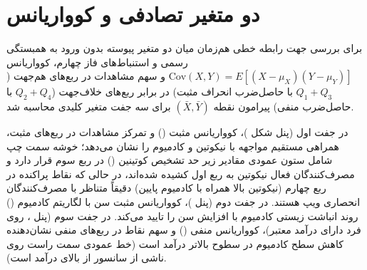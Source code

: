\documentclass[12pt]{exam}
\begin{document}
\section{دو متغیر تصادفی و کوواریانس}

برای بررسی جهت رابطه خطی هم‌زمان میان دو متغیر پیوسته بدون ورود به همبستگی رسمی و استنباط‌های فاز چهارم، کوواریانس $\text{Cov}(X, Y) = E[(X - \mu_X)(Y - \mu_Y)]$ و سهم مشاهدات در ربع‌های هم‌جهت ($Q_1 + Q_3$ با حاصل‌ضرب انحراف مثبت) در برابر ربع‌های خلاف‌جهت ($Q_2 + Q_4$ با حاصل‌ضرب منفی) پیرامون نقطه $(\bar{X}, \bar{Y})$ برای سه جفت متغیر کلیدی محاسبه شد.

\begin{table}[htbp]
\centering
\caption{کوواریانس تجربی، سهم ربع‌های هم‌جهت و خلاف‌جهت و جهت رابطه برای سه جفت متغیر پیوسته}
\end{table}

در جفت اول (پنل  شکل )، کوواریانس مثبت () و تمرکز  مشاهدات در ربع‌های مثبت، همراهی مستقیم مواجهه با نیکوتین و کادمیوم را نشان می‌دهد؛ خوشه سمت چپ شامل ستون عمودی مقادیر زیر حد تشخیص کوتینین () در ربع سوم قرار دارد و مصرف‌کنندگان فعال نیکوتین به ربع اول کشیده شده‌اند، در حالی که نقاط پراکنده در ربع چهارم (نیکوتین بالا همراه با کادمیوم پایین) دقیقاً متناظر با مصرف‌کنندگان انحصاری ویپ هستند. در جفت دوم (پنل )، کوواریانس مثبت سن با لگاریتم کادمیوم () روند انباشت زیستی کادمیوم با افزایش سن را تایید می‌کند. در جفت سوم (پنل ، روی  فرد دارای درآمد معتبر)، کوواریانس منفی () و سهم  نقاط در ربع‌های منفی نشان‌دهنده کاهش سطح کادمیوم در سطوح بالاتر درآمد است (خط عمودی سمت راست روی  ناشی از سانسور از بالای درآمد است).
\end{document}
